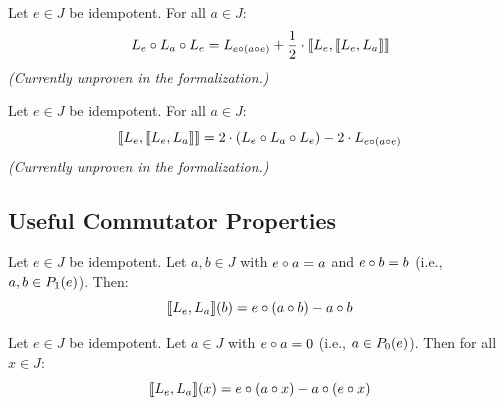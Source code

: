 \begin{theorem}[L\_e\_L\_a\_L\_e]
Let $e \in J$ be idempotent. For all $a \in J$:
\[ \Lop{e} \circ \Lop{a} \circ \Lop{e} = \Lop{e \jmul (a \jmul e)} + \frac{1}{2} \cdot \llbracket \Lop{e}, \llbracket \Lop{e}, \Lop{a} \rrbracket \rrbracket \]
\emph{(Currently unproven in the formalization.)}
\end{theorem}

\begin{theorem}
Let $e \in J$ be idempotent. For all $a \in J$:
\[ \llbracket \Lop{e}, \llbracket \Lop{e}, \Lop{a} \rrbracket \rrbracket = 2 \cdot (\Lop{e} \circ \Lop{a} \circ \Lop{e}) - 2 \cdot \Lop{e \jmul (a \jmul e)} \]
\emph{(Currently unproven in the formalization.)}
\end{theorem}

\subsection{Useful Commutator Properties}

\begin{theorem}[opComm\_on\_P1]
Let $e \in J$ be idempotent. Let $a, b \in J$ with $e \jmul a = a$ and $e \jmul b = b$ (i.e., $a, b \in \Peirce{e}{1}$). Then:
\[ \llbracket \Lop{e}, \Lop{a} \rrbracket(b) = e \jmul (a \jmul b) - a \jmul b \]
\end{theorem}

\begin{theorem}[opComm\_on\_P0]
Let $e \in J$ be idempotent. Let $a \in J$ with $e \jmul a = 0$ (i.e., $a \in \Peirce{e}{0}$). Then for all $x \in J$:
\[ \llbracket \Lop{e}, \Lop{a} \rrbracket(x) = e \jmul (a \jmul x) - a \jmul (e \jmul x) \]
\end{theorem}
